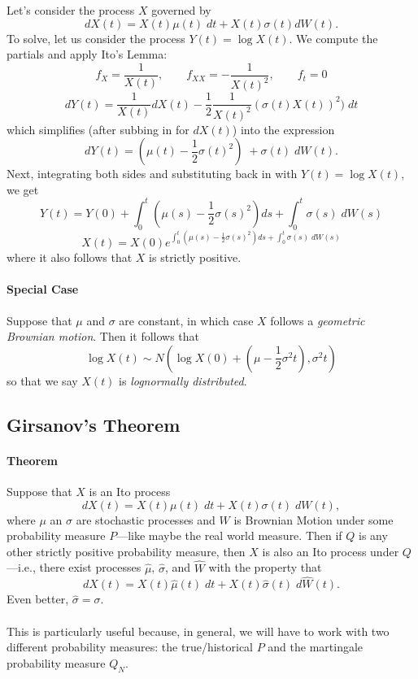 \documentclass[12pt]{article}
\theoremstyle{plain}
\theoremstyle{definition}
\theoremstyle{remark}
\begin{document}
Let's consider the process $X$ governed by
   \[ dX(t) = X(t)\mu(t) \; dt + X(t) \sigma(t) dW(t).\]
To solve, let us consider the process $Y(t) = \log X(t)$.  We compute
the partials and apply Ito's Lemma:
   \[ f_X = \frac{1}{X(t)}, \qquad f_{XX} = -\frac{1}{X(t)^2},
      \qquad f_t = 0 \]
   \[ dY(t) = \frac{1}{X(t)} dX(t) - \frac{1}{2}\frac{1}{X(t)^2}
      (\sigma(t) X(t))^2 ) \; dt \]
which simplifies (after subbing in for $dX(t)$) into the expression
   \[ dY(t) = \left( \mu(t) - \frac{1}{2}\sigma(t)^2\right) \; +
      \sigma(t) \; dW(t).\]
Next, integrating both sides and substituting back in with
$Y(t) = \log X(t)$, we get
   \[ Y(t) = Y(0) + \int^t_0 \left( \mu(s)-\frac{1}{2}\sigma(s)^2\right)
      ds + \int^t_0 \sigma(s) \; dW(s) \]
   \[ X(t)=X(0) e^{\int^t_0 \left( \mu(s)-\frac{1}{2}\sigma(s)^2\right)
       ds + \int^t_0 \sigma(s) \; dW(s)}\]
where it also follows that $X$ is strictly positive.

\paragraph{Special Case} Suppose that $\mu$ and $\sigma$ are constant,
in which case $X$ follows a \emph{geometric Brownian motion}.  Then
it follows that
   \[ \log X(t) \sim N\left( \log X(0) + \left(\mu - \frac{1}{2} \sigma^2
      t\right), \sigma^2 t \right) \]
so that we say $X(t)$ is \emph{lognormally distributed}.

\subsection{Girsanov's Theorem}

\paragraph{Theorem} Suppose that $X$ is an Ito process
   \[ dX(t) = X(t) \mu(t) \; dt + X(t) \sigma(t) \; dW(t),\]
where $\mu$ an $\sigma$ are stochastic processes and $W$ is Brownian
Motion under some probability measure $P$---like maybe the real
world measure.  Then if $Q$ is any other strictly positive probability
measure, then $X$ is also an Ito process under $Q$---i.e., there
exist processes $\hat{\mu}$, $\hat{\sigma}$, and $\hat{W}$ with the
property that
\begin{equation}
\label{Girsanov}
    dX(t) = X(t) \hat{\mu}(t) \; dt + X(t) \hat{\sigma}(t) \;
      d\hat{W}(t).
\end{equation}
Even better, $\hat{\sigma} = \sigma$.
\\
\\
This is particularly useful because, in general, we will have to work
with two different probability measures: the true/historical $P$ and
the martingale probability measure $Q_N$.
\end{document}
